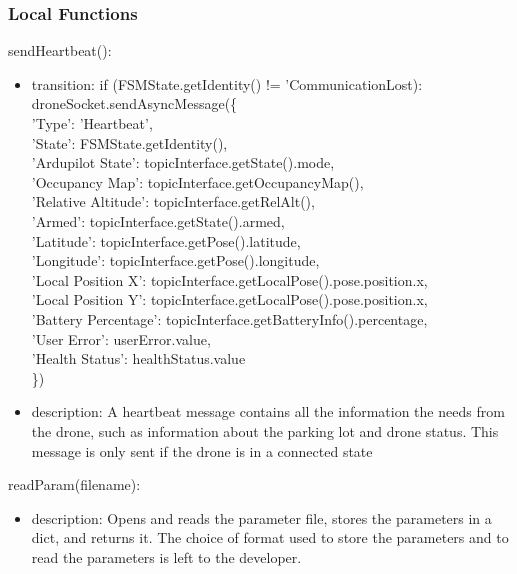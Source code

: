 \documentclass[12pt, titlepage]{article}
\begin{document}
\subsubsection{Local Functions}
\noindent sendHeartbeat():
\begin{itemize}
\item transition: if (FSMState.getIdentity() != 'CommunicationLost): \\
droneSocket.sendAsyncMessage(\{ \\
            'Type': 'Heartbeat', \\
            'State': FSMState.getIdentity(), \\
            'Ardupilot State': topicInterface.getState().mode, \\
            'Occupancy Map': topicInterface.getOccupancyMap(), \\
            'Relative Altitude': topicInterface.getRelAlt(), \\
            'Armed': topicInterface.getState().armed, \\
            'Latitude': topicInterface.getPose().latitude, \\
            'Longitude': topicInterface.getPose().longitude, \\
            'Local Position X': topicInterface.getLocalPose().pose.position.x, \\
            'Local Position Y': topicInterface.getLocalPose().pose.position.x, \\
            'Battery Percentage': topicInterface.getBatteryInfo().percentage, \\
            'User Error': userError.value, \\
            'Health Status': healthStatus.value \\
\})
\item description: A heartbeat message contains all the information the  needs from the drone, such as information about the parking lot and drone status. This message is only sent if the drone is in a connected state
\end{itemize}
\noindent readParam(filename):
\begin{itemize} 
\item description: Opens and reads the parameter file, stores the parameters in a dict, and returns it. The choice of format used to store the parameters and to read the parameters is left to the developer.
\end{itemize}
\end{document}
